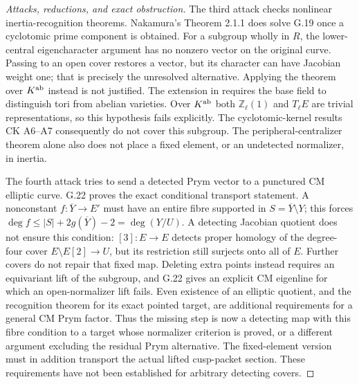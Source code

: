 \begin{proof}[Attacks, reductions, and exact obstruction]
The third attack checks nonlinear inertia-recognition theorems.
Nakamura's Theorem 2.1.1 does solve G.19 once a cyclotomic
prime component is obtained. For a subgroup wholly in $R$, the
lower-central eigencharacter argument has no nonzero vector on
the original curve. Passing to an open cover restores a vector,
but its character can have Jacobian weight one; that is precisely
the unresolved alternative. Applying the theorem over $K^{\rm ab}$
instead is not justified. The extension in
\citet[\S5, Theorem 20 and Corollary 22]{Stix2008Cuspidal}
requires the base field to distinguish tori from abelian varieties.
Over $K^{\rm ab}$ both $\mathbb Z_\ell(1)$ and $T_\ell E$
are trivial representations, so this hypothesis fails explicitly.
The cyclotomic-kernel results CK A6--A7 consequently do not cover
this subgroup. The peripheral-centralizer theorem alone also does
not place a fixed element, or an undetected normalizer, in inertia.

The fourth attack tries to send a detected Prym vector to a
punctured CM elliptic curve. G.22 proves the exact conditional
transport statement. A nonconstant $f:\overline Y\to E'$ must
have an entire fibre supported in $S=\overline Y\setminus Y$;
this forces $\deg f\le |S|+2g(\overline Y)-2=\deg(Y/U)$.
A detecting Jacobian quotient does not ensure this condition:
$[3]:E\to E$ detects proper homology of the degree-four cover
$E\setminus E[2]\to U$, but its restriction still surjects
onto all of $E$. Further covers do not repair that fixed map.
Deleting extra points instead requires an equivariant lift of
the subgroup, and G.22 gives an explicit CM eigenline for which
an open-normalizer lift fails. Even existence of an elliptic
quotient, and the recognition theorem for its exact pointed
target, are additional requirements for a general CM Prym
factor. Thus the missing step is now a detecting map with this
fibre condition to a target whose normalizer criterion is proved,
or a different argument excluding the residual Prym alternative.
The fixed-element version must in addition transport the actual
lifted cusp-packet section. These requirements have not been
established for arbitrary detecting covers.
\end{proof}


